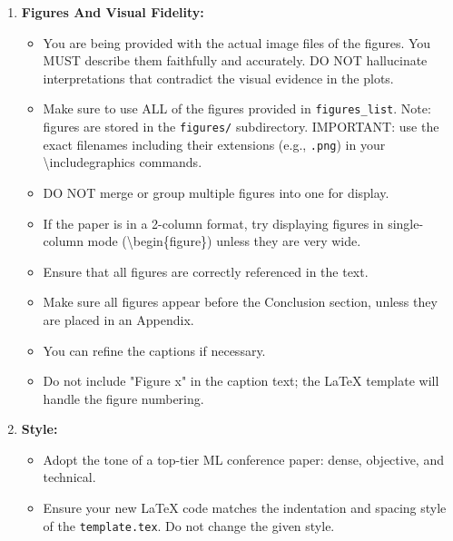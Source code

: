 \begin{enumerate}
\begin{itemize}
        \item Use formal mathematical equations, notations, and definitions where appropriate and directly supported by the idea/log. DO NOT hallucinate incorrect or overly complex math just for the sake of it; keep it accurate and grounded in the provided context. Avoid overly colloquial summaries.
        \item Always provide detailed ablation studies and qualitative analysis of the experimental results: what works, what does not, and why.
        \item Nice to have: discuss the limitations and future work at the end.
        \item If you want to put anything in the Appendix, make sure the Appendix section appears after the References section, on a fresh new page.
    \end{itemize}
    \item \textbf{Figures And Visual Fidelity:}
    \begin{itemize}
        \item You are being provided with the actual image files of the figures. You MUST describe them faithfully and accurately. DO NOT hallucinate interpretations that contradict the visual evidence in the plots.
        \item Make sure to use ALL of the figures provided in \texttt{figures\_list}. Note: figures are stored in the \texttt{figures/} subdirectory. IMPORTANT: use the exact filenames including their extensions (e.g., \texttt{.png}) in your \textbackslash{}includegraphics commands.
        \item DO NOT merge or group multiple figures into one for display.
        \item If the paper is in a 2-column format, try displaying figures in single-column mode (\textbackslash{}begin\{figure\}) unless they are very wide.
        \item Ensure that all figures are correctly referenced in the text. 
        \item Make sure all figures appear before the Conclusion section, unless they are placed in an Appendix.
        \item You can refine the captions if necessary.
        \item Do not include "Figure x" in the caption text; the LaTeX template will handle the figure numbering.
    \end{itemize}
    \item \textbf{Style:}
    \begin{itemize}
        \item Adopt the tone of a top-tier ML conference paper: dense, objective, and technical.
        \item Ensure your new LaTeX code matches the indentation and spacing style of the \texttt{template.tex}. Do not change the given style.
    \end{itemize}
\end{enumerate}

